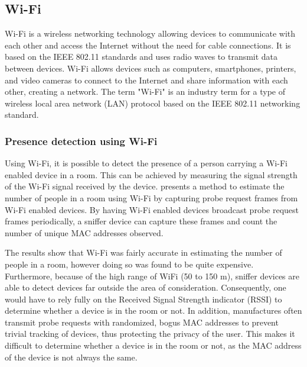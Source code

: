 \subsection{Wi-Fi} \label{sec:wi-fi}
Wi-Fi is a wireless networking technology allowing devices to communicate with each other and access the Internet without the need for cable connections.
It is based on the IEEE 802.11 standards and uses radio waves to transmit data between devices.
Wi-Fi allows devices such as computers, smartphones, printers, and video cameras to connect to the Internet and share information with each other, creating a network.
The term "Wi-Fi" is an industry term for a type of wireless local area network (LAN) protocol based on the IEEE 802.11 networking standard.\cite{WiFiAllianceDiscover,CiscoWhatIsWiFi}

\subsubsection{Presence detection using Wi-Fi}
Using Wi-Fi, it is possible to detect the presence of a person carrying a Wi-Fi enabled device in a room.
This can be achieved by measuring the signal strength of the Wi-Fi signal received by the device.
\citeauthor{longoAccurateOccupancyEstimation2019} presents a method to estimate the number of people in a room using Wi-Fi by capturing probe request frames from Wi-Fi enabled devices.
By having Wi-Fi enabled devices broadcast probe request frames periodically, a sniffer device can capture these frames and count the number of unique MAC addresses observed. \cite{longoAccurateOccupancyEstimation2019}

The results show that Wi-Fi was fairly accurate in estimating the number of people in a room, however doing so was found to be quite expensive.
Furthermore, because of the high range of WiFi (50 to 150 m), sniffer devices are able to detect devices far outside the area of consideration.
Consequently, one would have to rely fully on the Received Signal Strength indicator (RSSI) to determine whether a device is in the room or not.
In addition, manufactures often transmit probe requests with randomized, bogus MAC addresses to prevent trivial tracking of devices, thus protecting the privacy of the user.
This makes it difficult to determine whether a device is in the room or not, as the MAC address of the device is not always the same.\cite{longoAccurateOccupancyEstimation2019}